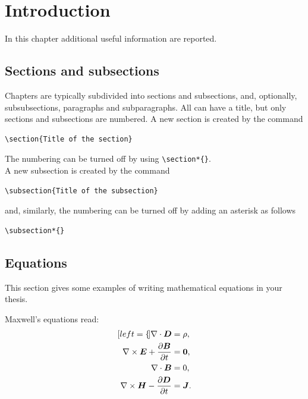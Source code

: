 \documentclass{Configuration_Files/PoliMi3i_thesis}
\begin{document}
\chapter{Introduction}
\label{ch:chapter_one}%

In this chapter additional useful information are reported.

\section{Sections and subsections}
\label{sec:section_name}
Chapters are typically subdivided into sections and subsections, and, optionally,
subsubsections, paragraphs and subparagraphs.
All can have a title, but only sections and subsections are numbered.
A new section is created by the command
\begin{verbatim}
\section{Title of the section}
\end{verbatim}
The numbering can be turned off by using \verb|\section*{}|.
\\
A new subsection is created by the command
\begin{verbatim}
\subsection{Title of the subsection}
\end{verbatim}
and, similarly, the numbering can be turned off by adding an asterisk as follows 
\begin{verbatim}
\subsection*{}
\end{verbatim}

\section{Equations}
\label{sec:eqs}
This section gives some examples of writing mathematical equations in your thesis.

Maxwell's equations read:
\begin{subequations}
    \label{eq:maxwell}
    \begin{align}[left=\empheqlbrace]
    \nabla\cdot \bm{D} & = \rho, \label{eq:maxwell1} \\
    \nabla \times \bm{E} +  \frac{\partial \bm{B}}{\partial t} & = \bm{0}, \label{eq:maxwell2} \\
    \nabla\cdot \bm{B} & = 0, \label{eq:maxwell3} \\
    \nabla \times \bm{H} - \frac{\partial \bm{D}}{\partial t} &= \bm{J}. \label{eq:maxwell4}
    \end{align}
\end{subequations}
\end{document}
